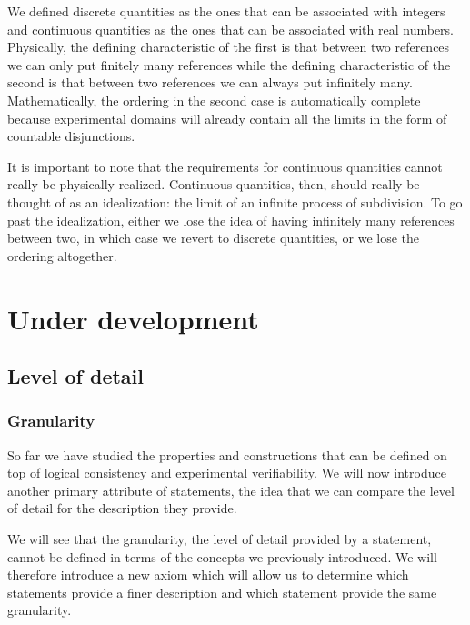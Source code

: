 \documentclass[11pt,letterpaper,fleqn]{memoir} %
\begin{document}
We defined discrete quantities as the ones that can be associated with integers and continuous quantities as the ones that can be associated with real numbers. Physically, the defining characteristic of the first is that between two references we can only put finitely many references while the defining characteristic of the second is that between two references we can always put infinitely many. Mathematically, the ordering in the second case is automatically complete because experimental domains will already contain all the limits in the form of countable disjunctions.

It is important to note that the requirements for continuous quantities cannot really be physically realized. Continuous quantities, then, should really be thought of as an idealization: the limit of an infinite process of subdivision. To go past the idealization, either we lose the idea of having infinitely many references between two, in which case we revert to discrete quantities, or we lose the ordering altogether.

\part{Under development}

\chapter{Level of detail}

\def\eqgran{\doteq}
\def\finer{\leqdot}
\def\nfiner{\nleqdot}
\def\coarser{\geqdot}
\def\sfiner{\lessdot}
\def\scoarser{\gtrdot}

\section{Granularity}

So far we have studied the properties and constructions that can be defined on top of logical consistency and experimental verifiability. We will now  introduce another primary attribute of statements, the idea that we can compare the level of detail for the description they provide.

We will see that the granularity, the level of detail provided by a statement, cannot be defined in terms of the concepts we previously introduced. We will therefore introduce a new axiom which will allow us to determine which statements provide a finer description and which statement provide the same granularity.
\end{document}

